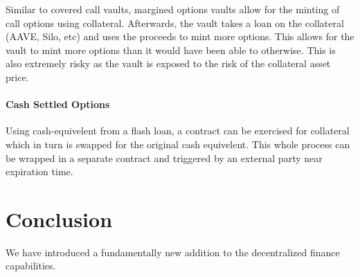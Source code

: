 \documentclass[%
 reprint,
 amsmath,amssymb,
 aps,
]{revtex4-2}
\begin{document}
Similar to covered call vaults, margined options vaults allow for the
minting of call options using collateral. Afterwards, the vault takes a
loan on the collateral (AAVE, Silo, etc) and uses the proceeds to mint
more options. This allows for the vault to mint more options than it
would have been able to otherwise. This is also extremely risky as the 
vault is exposed to the risk of the collateral asset price.

\paragraph*{Cash Settled Options} 

Using cash-equivelent from a flash loan, 
a contract can be exercised for collateral which 
in turn is swapped for the original cash equivelent.
This whole process can be wrapped in a separate contract
and triggered by an external party near expiration time.

\section{Conclusion}
We have introduced a fundamentally new addition to the decentralized
finance capabilities. 




\end{document}
